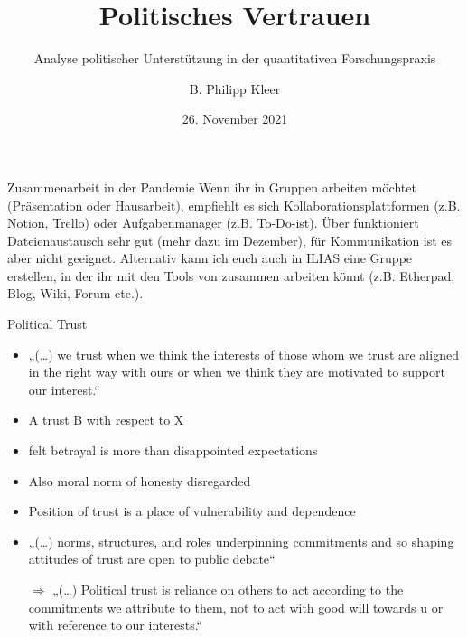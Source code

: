 \documentclass[11pt]{beamer}
\title{Politisches Vertrauen}
\subtitle{Analyse politischer Unterstützung in der quantitativen Forschungspraxis}
\date{26. November 2021}
\author{B. Philipp Kleer}
\institute{Institut für Politikwissenschaft | Justus-Liebig-Universität Gießen}
\begin{document}
\begin{frame}
\titlepage
\end{frame}

\begin{frame}[t]{Zusammenarbeit in der Pandemie}
Wenn ihr in Gruppen arbeiten möchtet (Präsentation oder Hausarbeit), empfiehlt es sich Kollaborationsplattformen (z.B. Notion, Trello) oder Aufgabenmanager (z.B. To-Do-ist). Über  funktioniert Dateienaustausch sehr gut (mehr dazu im Dezember), für Kommunikation ist es aber nicht geeignet. Alternativ kann ich euch auch in ILIAS eine Gruppe erstellen, in der ihr mit den Tools von  zusammen arbeiten könnt (z.B. Etherpad, Blog, Wiki, Forum etc.).

\end{frame}

\begin{frame}[t]{Political Trust}
\begin{itemize}
	\item „(…) we trust when we think the interests of those whom we trust are aligned in the right way with ours or when we think they are motivated to support our interest.“ \parencite[447]{Festenstein2019}
	\item A trust B with respect to X \parencite[449]{Festenstein2019}
	\item felt betrayal is more than disappointed expectations \parencite[450]{Festenstein2019}
	\item Also moral norm of honesty disregarded
	\item Position of trust is a place of vulnerability and dependence \parencite[451]{Festenstein2019}
	\item „(…) norms, structures, and roles underpinning commitments and so shaping attitudes of trust are open to public debate“ \parencite[454]{Festenstein2019}
	\item[$\Rightarrow$]„(…) Political trust is reliance on others to act according to the commitments we attribute to them, not to act with good will towards u or with reference to our interests.“ \parencite[455]{Festenstein2019}
\end{itemize}

\end{frame}
\end{document}
